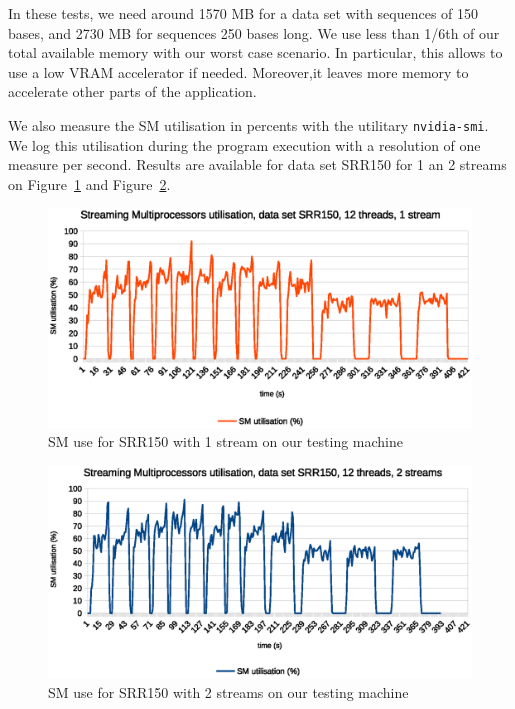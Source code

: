 In these tests, we need around 1570 MB for a data set with sequences of 150 bases, and 2730 MB for sequences 250 bases long. We use less than 1/6th of our total available memory with our worst case scenario. In particular, this allows to use a low VRAM accelerator if needed. Moreover,it leaves more memory to accelerate other parts of the application.

We also measure the SM utilisation in percents with the utilitary \verb|nvidia-smi|. We log this utilisation during the program execution with a resolution of one measure per second. Results are available for data set SRR150 for 1 an 2 streams on Figure~\ref{fig:sm-use-srr150-1str} and Figure~\ref{fig:sm-use-srr150-2str}.

\begin{figure}[h]
	\centering
	\includegraphics[width=0.9\linewidth]{SM_utilisation_12threads1stream}
	\caption{SM use for SRR150 with 1 stream on our testing machine}
	\label{fig:sm-use-srr150-1str}
\end{figure}

\begin{figure}[h]
	\centering
	\includegraphics[width=0.9\linewidth]{SM_utilisation_12threads2streams}
	\caption{SM use for SRR150 with 2 streams on our testing machine}
	\label{fig:sm-use-srr150-2str}
\end{figure}

